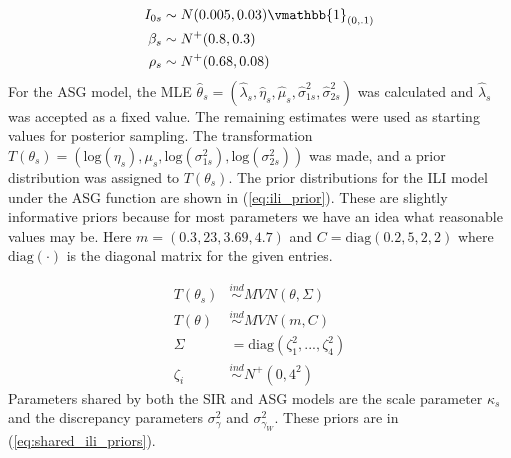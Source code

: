 \begin{equation}
\begin{aligned}
    \label{eq:sir_prior}
        I_{0s} &\sim N(0.005, 0.03) \vmathbb{1}_{(0, .1)} \\
        \beta_s &\sim N^+(0.8, 0.3) \\
        \rho_s &\sim N^+(0.68, 0.08)
\end{aligned}
\end{equation}
For the ASG model, the MLE 
$\hat{\theta}_s = (\hat{\lambda}_s, \hat{\eta}_s, \hat{\mu}_s, \hat{\sigma}_{1s}^2, \hat{\sigma}_{2s}^2)$ was calculated and $\hat{\lambda}_s$ was accepted as a fixed value. The remaining estimates were used as starting values for posterior sampling. The transformation $T(\theta_s) = (\text{log}(\eta_s), \mu_s, \text{log}(\sigma_{1s}^2), \text{log}(\sigma_{2s}^2))$ was made, and a prior distribution was assigned to $T(\theta_s)$.
The prior distributions for the ILI model under the ASG function are shown 
in (\ref{eq:ili_prior}). These are slightly informative priors because for 
most parameters we have an idea what reasonable values may be. Here 
$m = (0.3, 23, 3.69, 4.7)$ and $C = \text{diag}(0.2, 5, 2, 2)$
where $\text{diag}(\cdot)$ 
is the diagonal matrix for the given entries.


\begin{equation}
\begin{aligned}
\label{eq:ili_prior}
                T(\theta_s) &\overset{ind}{\sim} MVN(\theta, \Sigma) \\
                T(\theta) &\overset{ind}{\sim} MVN(m, C)\\
                \Sigma &= \text{diag}(\zeta^2_1,...,\zeta^2_4) \\
                \zeta_i &\overset{ind}{\sim} N^+(0,4^2)
\end{aligned}
\end{equation}
Parameters shared by both the SIR and ASG models are the scale parameter 
$\kappa_s$ and the discrepancy parameters $\sigma_{\gamma}^2$ and 
$\sigma_{\gamma_W}^2$. These priors are in (\ref{eq:shared_ili_priors}). 

